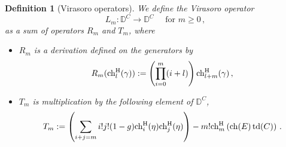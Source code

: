 \documentclass[11pt]{amsart}
\newtheorem{definition}[theorem]{Definition}
\theoremstyle{remark}
\newcommand{\ch}{{\rm ch}}
\newcommand{\D}{\mathbb{D}}
\newcommand{\td}[0]{\textnormal{td}}
\newcommand{\chh}[0]{\textnormal{ch}^\textnormal{H}}
\numberwithin{theorem}{section}
\begin{document}
\begin{definition}[Virasoro operators]\label{definition virasoro operators}
    We define the Virasoro operator
    $$ L_m : \D^C \to \D^C \quad \text{ for } m\geqslant 0\,, $$
    as a sum of operators $R_m$ and $T_m$, where
    \begin{itemize}
        \item $R_m$ is a derivation defined on the generators by
        \begin{equation*}%
            R_m(\chh_l(\gamma)) := \left( \prod_{i=0}^m (i+l) \right) \chh_{l+m}(\gamma)\,,
        \end{equation*} 
        \item $T_m$ is multiplication by the following element of $\D^C$,
        \begin{equation*}%
            T_m := \left( \sum_{i+j=m} i!j!(1-g)\chh_i(\eta)\chh_j(\eta) \right) - m!\chh_m \left(\ch(E)\,\td(C) \right)\,.
        \end{equation*}
    \end{itemize}
\end{definition}
\end{document}
